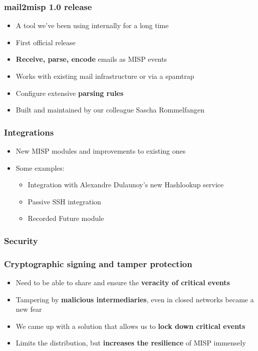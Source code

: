 \begin{frame}
\frametitle{mail2misp 1.0 release}
\begin{itemize}
	\item A tool we've been using internally for a long time
        \item First official release
        \item {\bf Receive, parse, encode} emails as MISP events
        \item Works with existing mail infrastructure or via a spamtrap
        \item Configure extensive {\bf parsing rules}
        \item Built and maintained by our colleague Sascha Rommelfangen
\end{itemize}
\end{frame}

\begin{frame}
\frametitle{Integrations}
\begin{itemize}
	\item New MISP modules and improvements to existing ones
        \item Some examples:
        \begin{itemize}
            \item Integration with Alexandre Dulaunoy's new Hashlookup service
            \item Passive SSH integration
            \item Recorded Future module
        \end{itemize}
\end{itemize}
\end{frame}


\begin{frame}
  \frametitle{Security}
\end{frame}


\begin{frame}
  \frametitle{Cryptographic signing and tamper protection}
  \begin{itemize}
     \item Need to be able to share and ensure the {\bf veracity of critical events}
     \item Tampering by {\bf malicious intermediaries}, even in closed networks became a new fear
     \item We came up with a solution that allows us to {\bf lock down critical events}
     \item Limits the distribution, but {\bf increases the resilience} of MISP immensely
  \end{itemize}
\end{frame}

